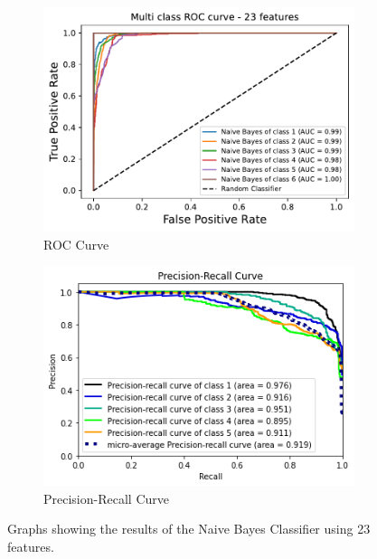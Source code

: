 \documentclass[10pt, a4paper, twocolumn]{article}
\begin{document}
\begin{figure}

    \centering
    \begin{subfigure}[t]{0.48\columnwidth}
    \includegraphics[width=\linewidth]{immagini Lia/dtc_multiclass_roc_23_features.pdf}
    \caption{ROC Curve}
    \label{fig:rocdt23}
\end{subfigure}
  \hfill %
\begin{subfigure}[t]{0.49\columnwidth}
    \centering
    \includegraphics[width=\linewidth]{immagini Lia/download.png}
    \caption{Precision-Recall Curve}
    \label{fig:prerecdt}
    \end{subfigure}
    
    \caption{Graphs showing the results of the Naive Bayes Classifier using 23 features.}\label{fig:dtc23}
    
\end{figure}
\end{document}
